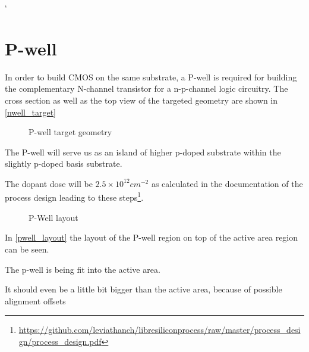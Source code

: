 `\section{P-well}\label{pwell_chapter}
In order to build CMOS on the same substrate, a P-well is required for building the complementary N-channel transistor for a n-p-channel logic circuitry.
The cross section as well as the top view of the targeted geometry are shown in \autoref{nwell_target}
\begin{figure}[H]
	\centering
	\begin{tikzpicture}[node distance = 3cm, auto, thick,scale=\CrossAndTopSectionBig, every node/.style={transform shape}]
		
	\end{tikzpicture}
	\begin{tikzpicture}[node distance = 3cm, auto, thick,scale=\CrossAndTopSectionBig, every node/.style={transform shape}]
		
	\end{tikzpicture}
	\caption{P-well target geometry}
	\label{pwell_target}
\end{figure}
The P-well will serve us as an island of higher p-doped substrate within the slightly p-doped basis substrate.

The dopant dose will be $2.5\times10^{12}cm^{-2}$ as calculated in the documentation of the process design leading to these steps\footnote{\url{https://github.com/leviathanch/libresiliconprocess/raw/master/process_design/process_design.pdf}}.

\begin{figure}[H]
	\centering
	\begin{tikzpicture}[node distance =1cm, auto, thick,scale=\VLSILayout, every node/.style={transform shape}]
		
	\end{tikzpicture}
	\caption{P-Well layout}
	\label{pwell_layout}
\end{figure}

In \autoref{pwell_layout} the layout of the P-well region on top of the active area region can be seen.

The p-well is being fit into the active area.

It should even be a little bit bigger than the active area, because of possible alignment offsets

\newpage

